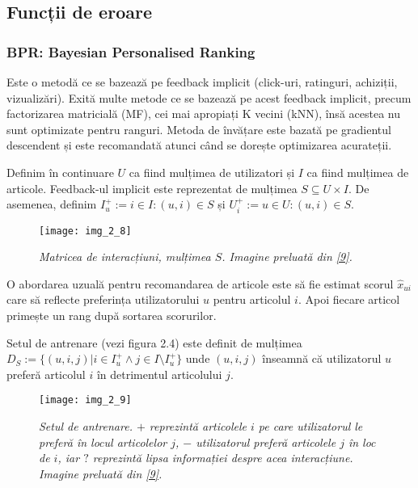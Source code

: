 \subsection{Funcții de eroare}

\subsubsection*{BPR: Bayesian Personalised Ranking}

Este o metodă ce se bazează pe feedback implicit (click-uri, ratinguri, achiziții, vizualizări). Exită multe metode ce se bazează pe acest feedback implicit, precum factorizarea matricială (MF), cei mai apropiați K vecini (kNN), însă acestea nu sunt optimizate pentru ranguri. Metoda de învățare este bazată pe gradientul descendent și este recomandată atunci când se dorește optimizarea acurateții.

Definim în continuare $U$ ca fiind mulțimea de utilizatori și $I$ ca fiind mulțimea de articole. Feedback-ul implicit este reprezentat de mulțimea $S \subseteq U \times I$. De asemenea, definim $I_u^+ := {i \in I:(u, i) \in S}$ și $U_i^+ := {u \in U:(u, i) \in S}$.
\begin{figure}[!h]
	\centering
	\texttt{[image: img\_2\_8]}
	\caption[Matricea de interacțiuni]{\textit{Matricea de interacțiuni, mulțimea $S$. Imagine preluată din \hyperlink{SteffenRendleChristophFreudenthalerZenoGantnerLarsSchmidtThieme}{[9]}.}}
\end{figure} 

O abordarea uzuală pentru recomandarea de articole este să fie estimat scorul $\hat{x}_{ui}$ care să reflecte preferința utilizatorului $u$ pentru articolul $i$. Apoi fiecare articol primește un rang după sortarea scorurilor.

Setul de antrenare (vezi figura 2.4) este definit de mulțimea $D_S := \{(u,i,j)|i \in I_u^+ \wedge j \in I \setminus I_u^+\}$ unde $(u,i,j)$ înseamnă că utilizatorul $u$ preferă articolul $i$ în detrimentul articolului $j$.
\begin{figure}[!h]
	\centering
	\texttt{[image: img\_2\_9]}
	\caption[Setul de antrenare]{\textit{Setul de antrenare. $+$ reprezintă articolele $i$ pe care utilizatorul le preferă în locul articolelor $j$, $-$ utilizatorul preferă articolele $j$ în loc de $i$, iar $?$ reprezintă lipsa informației despre acea interacțiune. Imagine preluată din \hyperlink{SteffenRendleChristophFreudenthalerZenoGantnerLarsSchmidtThieme}{[9]}.}}
\end{figure} 

